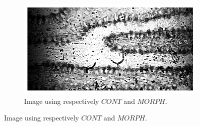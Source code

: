 \begin{figure}[h!]
\begin{subfigure}[b]{0.4\textwidth}
    \end{subfigure}
    \hspace*{\fill}
    \begin{subfigure}[b]{0.4\textwidth}
        \centering
        \includegraphics[width=\textwidth, frame]{afbeeldingen/rank/img_morph_cont.png}
        \caption{Image using respectively $CONT$ and  $MORPH$.}   
        \label{fig_rank_morph_cont}
    \end{subfigure}
    
	\medskip
    

\end{figure}

